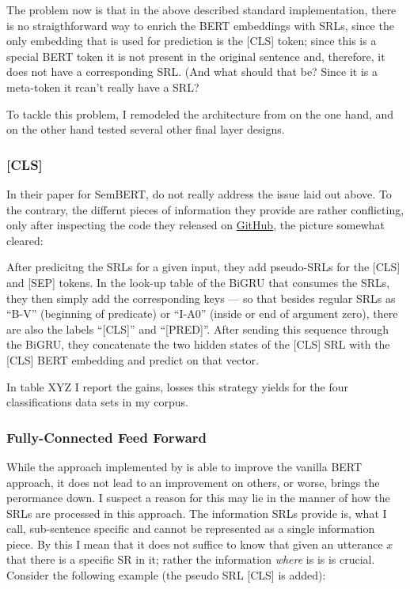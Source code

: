 The problem now is that in the above described standard implementation, there is no straigthforward way to enrich the BERT embeddings with SRLs, since the only embedding that is used for prediction is the [CLS] token;
since this is a special BERT token it is not present in the original sentence and, therefore, it does not have a corresponding SRL.
(And what should that be? Since it is a meta-token it rcan't really have a SRL?

To tackle this problem, I remodeled the architecture from \cite{zhang2019semantics} on the one hand, and on the other hand tested several other final layer designs.

\subsubsection{[CLS]}

In their paper for SemBERT, \cite{zhang2019semantics} do not really address the issue laid out above.
To the contrary, the differnt pieces of information they provide are rather conflicting, only after inspecting the code they released on \href{https://github.com/cooelf/SemBERT/}{GitHub}, the picture somewhat cleared:

After predicitng the SRLs for a given input, they add pseudo-SRLs for the [CLS] and [SEP] tokens.
In the look-up table of the BiGRU that consumes the SRLs, they then simply add the corresponding keys --- so that besides regular SRLs as ``B-V'' (beginning of predicate) or ``I-A0'' (inside or end of argument zero), there are also the labels ``[CLS]'' and ``[PRED]''.
After sending this sequence through the BiGRU, they concatenate the two hidden states of the [CLS] SRL with the [CLS] BERT embedding and predict on that vector.

In table XYZ I report the gains, losses this strategy yields for the four classifications data sets in my corpus.

\subsubsection{Fully-Connected Feed Forward}

While the approach implemented by \cite{zhang2019semantics} is able to improve the vanilla BERT approach, it does not lead to an improvement on others, or worse, brings the perormance down.
I suspect a reason for this may lie in the manner of how the SRLs are processed in this approach.
The information SRLs provide is, what I call, sub-sentence specific and cannot be represented as a single information piece.
By this I mean that it does not suffice to know that given an utterance $x$ that there is a specific SR in it; rather the information \emph{where} is is is crucial.
Consider the following example (the pseudo SRL [CLS] is added):

